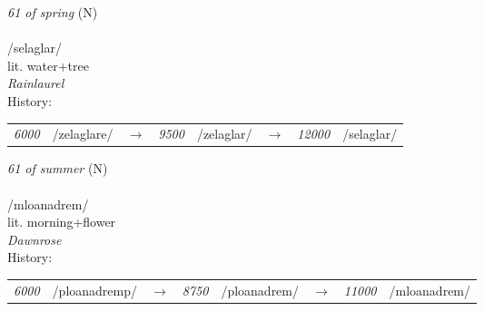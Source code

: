 \vspace{15pt}
\begin{nopagebreak}
 \textit{61 of spring} (N)\\
\\
\noindent /sel{\textprimstress}aglar/\\
\noindent lit. water+tree\\
\noindent \textit{Rainlaurel}\\


\noindent History:

\vspace{-0pt}
\hspace{40pt}
\begin{tabular}{ccc}
\textit{6000} & /zelaglare/&$\rightarrow$ & \textit{9500} & /zelaglar/&$\rightarrow$ & \textit{12000} & /selaglar/& \\
\end{tabular}

\vspace{20pt}\hline

\end{nopagebreak}
\filbreak



\vspace{15pt}
\begin{nopagebreak}
 \textit{61 of summer} (N)\\
\\
\noindent /mloan{\textprimstress}adrem/\\
\noindent lit. morning+flower\\
\noindent \textit{Dawnrose}\\


\noindent History:

\vspace{-0pt}
\hspace{40pt}
\begin{tabular}{ccc}
\textit{6000} & /ploanadremp/&$\rightarrow$ & \textit{8750} & /ploanadrem/&$\rightarrow$ & \textit{11000} & /mloanadrem/& \\
\end{tabular}

\vspace{20pt}\hline

\end{nopagebreak}
\filbreak



